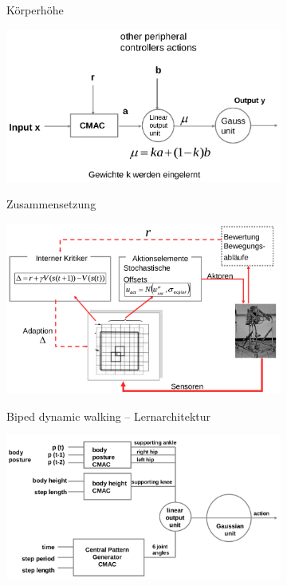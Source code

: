\begin{figure}
\begin{subfigure}{.5\textwidth}
		\label{ch:09:fig:koerperhoehe}
		\caption{Körperhöhe}
	\end{subfigure}
	\begin{subfigure}{.5\textwidth}
		\centering
		\includegraphics[width=\textwidth]{figures/zusammensetzung.png}
		\label{ch:09:fig:zusammensetzung}
		\caption{Zusammensetzung}
	\end{subfigure}
	\begin{subfigure}{.5\textwidth}
		\centering
		\includegraphics[width=\textwidth]{figures/bdw_lernarchitektur.png}
		\label{ch:09:fig:bdw-lernarchitektur}
		\caption{Biped dynamic walking -- Lernarchitektur}
	\end{subfigure}
	\begin{subfigure}{.5\textwidth}
		\centering
		\includegraphics[width=\textwidth]{figures/gesamtuebersicht_aktor.png}

\end{subfigure}
\end{figure}
